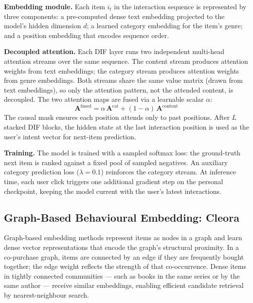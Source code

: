 \textbf{Embedding module.}
Each item $i_t$ in the interaction sequence is represented by three components: a pre-computed dense text embedding projected to the model's hidden dimension $d$; a learned category embedding for the item's genre; and a position embedding that encodes sequence order.

\textbf{Decoupled attention.}
Each DIF layer runs two independent multi-head attention streams over the same sequence.
The content stream produces attention weights from text embeddings; the category stream produces attention weights from genre embeddings.
Both streams share the same value matrix (drawn from text embeddings), so only the attention pattern, not the attended content, is decoupled.
The two attention maps are fused via a learnable scalar $\alpha$:
\begin{equation}
  \mathbf{A}^{\text{fused}} = \alpha\,\mathbf{A}^{\text{cat}} + (1 - \alpha)\,\mathbf{A}^{\text{content}}
\end{equation}
The causal mask ensures each position attends only to past positions.
After $L$ stacked DIF blocks, the hidden state at the last interaction position is used as the user's intent vector for next-item prediction.

\textbf{Training.}
The model is trained with a sampled softmax loss: the ground-truth next item is ranked against a fixed pool of sampled negatives.
An auxiliary category prediction loss ($\lambda = 0.1$) reinforces the category stream.
At inference time, each user click triggers one additional gradient step on the personal checkpoint, keeping the model current with the user's latest interactions.

\subsection{Graph-Based Behavioural Embedding: Cleora}
\label{sec:cleora}

Graph-based embedding methods represent items as nodes in a graph and learn dense vector representations that encode the graph's structural proximity.
In a co-purchase graph, items are connected by an edge if they are frequently bought together; the edge weight reflects the strength of that co-occurrence.
Dense items in tightly connected communities — such as books in the same series or by the same author — receive similar embeddings, enabling efficient candidate retrieval by nearest-neighbour search.

